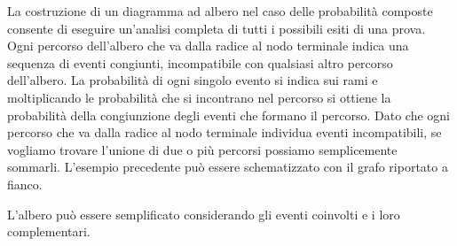 \noindent \begin{minipage}{.39\textwidth}
 La costruzione di un diagramma ad albero nel caso delle probabilità 
composte consente di eseguire un'analisi completa di tutti i possibili esiti 
di una prova. 
Ogni percorso dell'albero che va dalla radice al nodo 
terminale indica una sequenza di eventi congiunti, incompatibile con 
qualsiasi altro percorso dell'albero. 
La probabilità di ogni singolo evento si indica sui rami e 
moltiplicando le probabilità che si incontrano nel percorso si ottiene la 
probabilità della congiunzione degli eventi che formano il percorso.
Dato che ogni percorso che va dalla radice al nodo terminale individua 
eventi incompatibili, se vogliamo trovare l'unione di due o più percorsi 
possiamo semplicemente sommarli.
L'esempio precedente può essere schematizzato con il grafo riportato a 
fianco.
\end{minipage}
\hfil
\begin{minipage}{.59\textwidth}
 \begin{center}
 \scalebox{1}{}
\end{center}
\end{minipage}

L'albero può essere semplificato considerando gli eventi coinvolti e i loro 
complementari.

